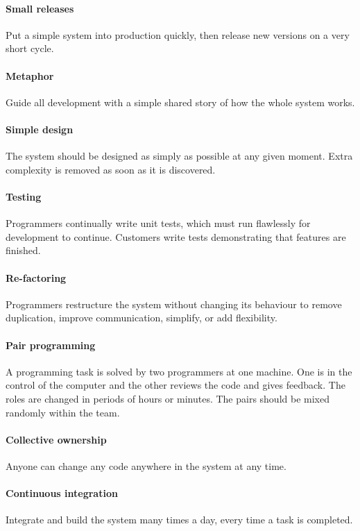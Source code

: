 \documentclass[12pt]{article}
\begin{document}
\paragraph{Small releases} Put a simple system into production quickly, then release new 
versions on a very short cycle. 

\paragraph{Metaphor} Guide all development with a simple shared story of how the 
whole system works. 

\paragraph{Simple design} The system should be designed as simply as possible at any 
given moment. Extra complexity is removed as soon as it is discovered. 

\paragraph{Testing} Programmers continually write unit tests, which must run flawlessly 
for development to continue. Customers write tests demonstrating that 
features are finished. 

\paragraph{Re-factoring} Programmers restructure the system without changing its  behaviour to remove duplication, improve communication, simplify, or add flexibility. 

\paragraph{Pair programming} A programming task is solved by two programmers at one machine. One is in the control of the computer and the other reviews the code and gives feedback. The roles are changed in periods of hours or minutes. The pairs should be mixed randomly within the team.   

\paragraph{Collective ownership} Anyone can change any code anywhere in the system at any time. 

\paragraph{Continuous integration} Integrate and build the system many times a day, every time a task is completed. 
\end{document}
